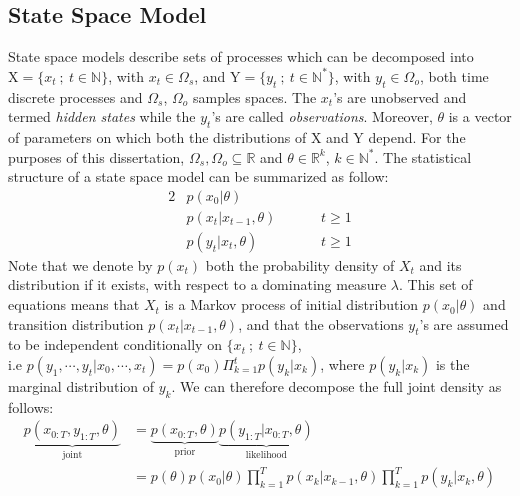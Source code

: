 \documentclass[12pt]{article}
\begin{document}
	\subsection{State Space Model}
	State space models describe sets of processes which can be decomposed into $\mathrm{X}=\{x_t \ ; \ t \in \mathbb{N}\}$, with $x_t \in \Omega_s$, and $\mathrm{Y}=\{y_t \ ; \ t \in \mathbb{N^*}\}$, with $y_t \in \Omega_o$, both time discrete processes and $\Omega_s$, $\Omega_o$ samples spaces. The $x_t$'s are unobserved and termed \emph{hidden states} while the $y_t$'s are called \emph{observations}. Moreover, $\theta$ is a vector of parameters on which both the distributions of $\mathrm{X}$ and $\mathrm{Y}$ depend. For the purposes of this dissertation, $\Omega_s, \Omega_o \subseteq \mathbb{R}$ and $\theta \in \mathbb{R}^k$, $k \in \mathbb{N^*}$. The statistical structure of a state space model can be summarized as follow: 
	\begin{alignat}{2}
	& p(x_0| \theta) &\\
	& p(x_t | x_{t-1}, \theta) \hspace{1cm} & t \ge 1\\
	& p(y_t | x_t, \theta)  & t \ge 1
	\end{alignat}
	Note that we denote by $p(x_t)$ both the probability density of $X_t$ and its distribution if it exists, with respect to a dominating measure $\lambda$. This set of equations means that $X_t$ is a Markov process of initial distribution $p(x_0| \theta)$ and transition distribution $p(x_t | x_{t-1}, \theta)$, and that the observations $y_t$'s are assumed to be independent conditionally on $\{x_t \ ; \ t \in \mathbb{N}\}$, \\ i.e $p(y_1, \cdots, y_t | x_0, \cdots, x_t) =p(x_0)\Pi_{k=1}^t p(y_k | x_k)$, where $p(y_k | x_k)$ is the marginal distribution of $y_k$. We can therefore decompose the full joint density as follows:
	\begin{align}
	\underbrace{p(x_{0:T}, y_{1:T}, \theta)}_{\text{joint}} & = \underbrace{p(x_{0:T}, \theta)}_{\text{prior}}\underbrace{p(y_{1:T}| x_{0:T}, \theta)}_{\text{likelihood}} \\
		& = p(\theta)p(x_0| \theta)\prod_{k=1}^{T}p(x_k|x_{k-1}, \theta)\prod_{k=1}^{T}p(y_k|x_k, \theta)
	\end{align}\\
	
\end{document}
